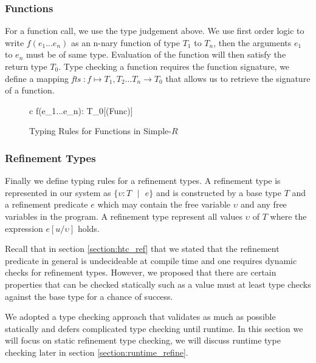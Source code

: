 \documentclass[a4paper,12pt]{report}
\begin{document}
\subsubsection{Functions}
For a function call, we use the type judgement above. We use  
first order logic to write $f(e_1...e_n)$ as an n-nary function of 
type $T_1$ to $T_n$, then the arguments $e_1$ to $e_n$ must be of same type. 
Evaluation of the function will then satisfy the return type $T_0$. Type checking 
a function requires the function signature, we define 
a mapping \textit{fts} $: f \mapsto T_1,T_2...T_n \longrightarrow T_0$ 
that allows us to retrieve the signature of a function. 

\begin{figure}[H]
  \begin{center}
    \begin{tabular} {c}
        {\Gamma \vdash f(e_1...e_n): T_0}[(Func)]
    \end{tabular}
  \end{center}
  \caption{Typing Rules for Functions in Simple-$R$}
\end{figure}

\subsubsection{Refinement Types} \label{section:ref_type_check}
Finally we define typing rules for a refinement types. A refinement type 
is represented in our system as $\{\upsilon : T\text{ }|\text{ }e\}$ and is 
constructed by a base type $T$ and a refinement predicate $e$ which may contain 
the free variable $\upsilon$ and any free variables in the program. A refinement 
type represent all values $\upsilon$ of $T$ where the expression $e[u/\upsilon]$ holds. 

\par
Recall that in section \ref{section:htc_ref} that we stated that the refinement 
predicate in general is undecideable at compile time and one requires dynamic 
checks for refinement types. However, we proposed that there are certain 
properties that can be checked statically such as a value must at least 
type checks against the base type for a chance of success. 

\par
We adopted a type checking approach that validates as much as possible 
statically and defers complicated type 
checking until runtime. In this section we will focus on static refinement type 
checking, we will discuss runtime type checking later in section 
\ref{section:runtime_refine}.
\end{document}
